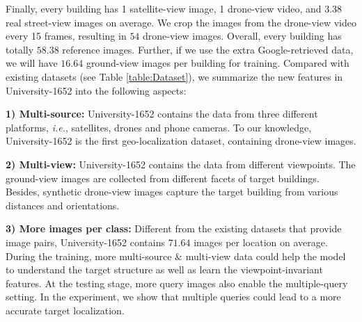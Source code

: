 \documentclass[sigconf]{acmart}
\def\ie{\emph{i.e.}}
\begin{document}
Finally, every building has 1 satellite-view image, 1 drone-view video, and  $3.38$ real street-view images on average. We crop the images from the drone-view video every 15 frames, resulting in $54$ drone-view images. Overall, every building has totally $58.38$ reference images. Further, if we use the extra Google-retrieved data, we will have $16.64$ ground-view images per building for training. Compared with existing datasets (see Table \ref{table:Dataset}), we summarize the new features in University-1652 into the following aspects:

\noindent\textbf{1) Multi-source:} University-1652 contains the data from three different platforms, \ie, satellites, drones and phone cameras. To our knowledge, University-1652 is the first geo-localization dataset, containing drone-view images. 

\noindent\textbf{2) Multi-view:} University-1652 contains the data from different viewpoints. The ground-view images are collected from different facets of target buildings. Besides, synthetic drone-view images capture the target building from various distances and orientations. 

\noindent\textbf{3) More images per class:} Different from the existing datasets that provide image pairs, University-1652 contains $71.64$ images per location on average. During the training, more multi-source $\&$ multi-view data could help the model to understand the target structure as well as learn the viewpoint-invariant features. At the testing stage, more query images also enable the multiple-query setting. In the experiment, we show that multiple queries could lead to a more accurate target localization. 
\end{document}
